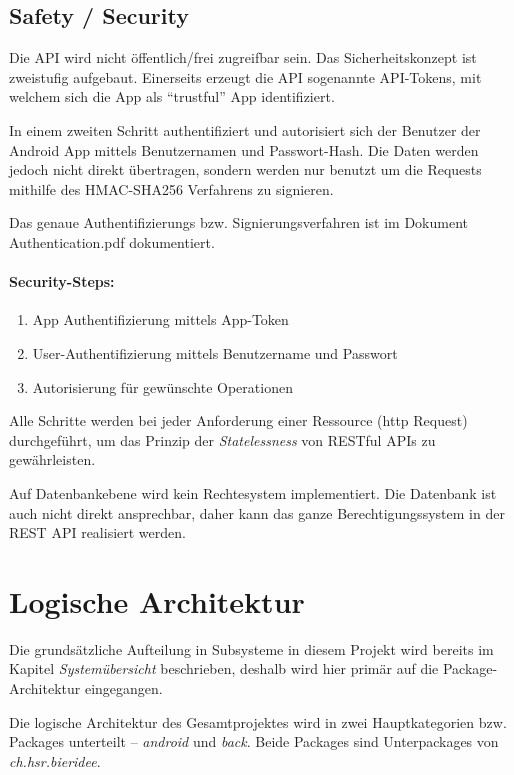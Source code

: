 \documentclass[10pt,a4paper]{scrartcl}
\begin{document}
\subsection{Safety / Security}

Die API wird nicht öffentlich/frei zugreifbar sein. Das Sicherheitskonzept ist zweistufig aufgebaut.
Einerseits erzeugt die API sogenannte API-Tokens, mit welchem sich die App als "`trustful"' App
identifiziert.

In einem zweiten Schritt authentifiziert und autorisiert sich der Benutzer der Android App mittels
Benutzernamen und Passwort-Hash. Die Daten werden jedoch nicht direkt übertragen, sondern werden nur
benutzt um die Requests mithilfe des HMAC-SHA256 Verfahrens zu signieren.

Das genaue Authentifizierungs bzw. Signierungsverfahren ist im Dokument Authentication.pdf dokumentiert.

\paragraph*{Security-Steps:}

\begin{enumerate}
	\item App Authentifizierung mittels App-Token
	\item User-Authentifizierung mittels Benutzername und Passwort
	\item Autorisierung für gewünschte Operationen
\end{enumerate}
 
Alle Schritte werden bei jeder Anforderung einer Ressource (http Request) durchgeführt, um das
Prinzip der \textit{Statelessness} von RESTful APIs zu gewährleisten.

Auf Datenbankebene wird kein Rechtesystem implementiert. Die Datenbank ist auch nicht direkt
ansprechbar, daher kann das ganze Berechtigungssystem in der REST API realisiert werden.


\section{Logische Architektur}

Die grundsätzliche Aufteilung in Subsysteme in diesem Projekt wird bereits im Kapitel
\textit{Systemübersicht} beschrieben, deshalb wird hier primär auf die Package-Architektur
eingegangen.

Die logische Architektur des Gesamtprojektes wird in zwei Hauptkategorien bzw. Packages unterteilt --
\textit{android} und \textit{back}. Beide Packages sind Unterpackages von
\textit{ch.hsr.bieridee}.
\end{document}

